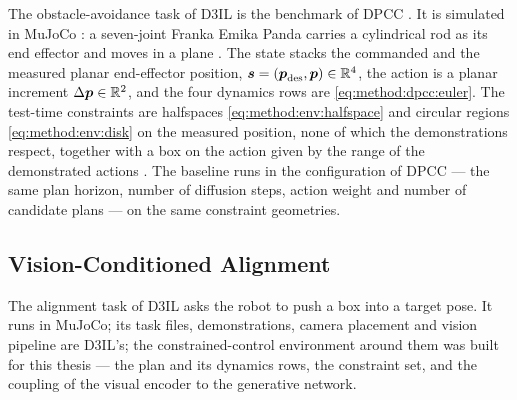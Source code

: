 The obstacle-avoidance task of D3IL \parencite{jia2024towards} is the benchmark of \ac{DPCC}
\parencite[Sec.~6.1]{romer2025diffusion}. It is simulated in MuJoCo
\parencite{todorov2012mujoco}: a seven-joint Franka Emika Panda carries a cylindrical rod as its end
effector and moves in a plane \parencite[Sec.~3.3]{jia2024towards}. The state stacks the commanded and the measured planar
end-effector position, $\boldsymbol{s} = (\boldsymbol{p}_{\textrm{des}},\boldsymbol{p})\in\mathbb{R}^{4}$, the action is a planar
increment $\Delta\boldsymbol{p}\in\mathbb{R}^{2}$, and the four dynamics rows are \eqref{eq:method:dpcc:euler}. The
test-time constraints are halfspaces \eqref{eq:method:env:halfspace} and circular regions
\eqref{eq:method:env:disk} on the measured position, none of which the demonstrations respect, together
with a box on the action given by the range of the demonstrated actions
\parencite[Sec.~6.1]{romer2025diffusion}. The baseline runs in the configuration of \ac{DPCC} --- the
same plan horizon, number of diffusion steps, action weight and number of candidate plans --- on the
same constraint geometries.

\subsection{Vision-Conditioned Alignment}\label{sec:method:env:aligning}

The alignment task of D3IL \parencite{jia2024towards} asks the robot to push a box into a target
pose. It runs in MuJoCo; its task files, demonstrations, camera placement and vision pipeline are
D3IL's; the constrained-control environment
around them was built for this thesis --- the plan and its dynamics rows, the constraint set, and the
coupling of the visual encoder to the generative network.

